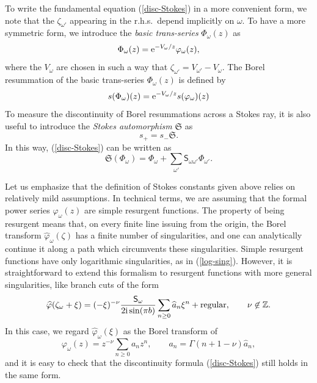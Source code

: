 \documentclass[a4paper,11pt]{article}
\theoremstyle{definition}
\def\IZ{{\mathbb Z}}
\newcommand{\re}{{\rm e}}
\newcommand{\ri}{{\rm i}}
\newcommand{\mS}{\mathsf{S}}
\newcommand{\be}{\begin{equation}}
\newcommand{\ee}{\end{equation}}
\begin{document}
To write the fundamental equation (\ref{disc-Stokes}) in a more convenient form, we note 
that the $\zeta_{\omega'}$ appearing in the r.h.s.~depend implicitly on $\omega$. To have 
a more symmetric form, we introduce the {\it basic trans-series} $\Phi_\omega(z)$
as 
%
\begin{equation}
  \Phi_\omega(z)=\re^{-V_\omega /z} \varphi_\omega(z),
\end{equation}
%
where the $V_\omega$ are chosen in such a way that $\zeta_{\omega'}=V_{\omega'}- V_\omega$. 
The Borel resummation of the basic trans-series $\Phi_\omega (z)$ is
defined by
%
\begin{equation}
  s(\Phi_\omega)(z) =\re^{-V_\omega /z} s(\varphi_\omega)(z)
\end{equation}
%
To measure the discontinuity of Borel resummations across a Stokes
ray, it is also useful to introduce the {\it Stokes automorphism} $\mathfrak{S}$ as
%
\begin{equation}
  s_+= s_- \mathfrak{S}. 
\end{equation}
%
In this way, (\ref{disc-Stokes}) can be written as 
%
\begin{equation}
  \mathfrak{S} (\Phi_\omega)= \Phi_{\omega}+ \sum_{\omega'}
  \mathsf{S}_{\omega \omega'} \Phi_{\omega'}. 
\end{equation}
%

Let us emphasize that the definition of Stokes constants given above
relies on relatively mild assumptions. In technical terms, we are
assuming that the formal power series $\varphi_\omega(z)$ are simple
resurgent functions. The property of being resurgent means that, on
every finite line issuing from the origin, the Borel transform
$\widehat \varphi_\omega(\zeta)$ has a finite number of singularities,
and one can analytically continue it along a path which circumvents
these singularities. Simple resurgent functions have only logarithmic
singularities, as in (\ref{log-sing}). However, it is straightforward
to extend this formalism to resurgent functions with more general
singularities, like branch cuts of the form
%
\begin{equation}
\label{borel-bc}
\widehat \varphi(\zeta_\omega+ \xi) = (-\xi)^{-\nu} {\mS_\omega  \over
  2 \ri \sin (\pi b)} \sum_{n \ge 0} \widehat a_n \xi^n+
{\text{regular}}, \qquad
\nu\not\in\IZ.
\end{equation}
%
In this case, we regard $\widehat \varphi_\omega(\xi)$ as the Borel
transform of
%
\be
\varphi_\omega(z)=z^{-\nu} \sum_{n \ge 0} a_n z^n, \qquad a_n= \Gamma(n+1-\nu) \widehat a_n, 
\ee
%
and it is easy to check that the discontinuity formula (\ref{disc-Stokes}) still holds in the same form. 
\end{document}
